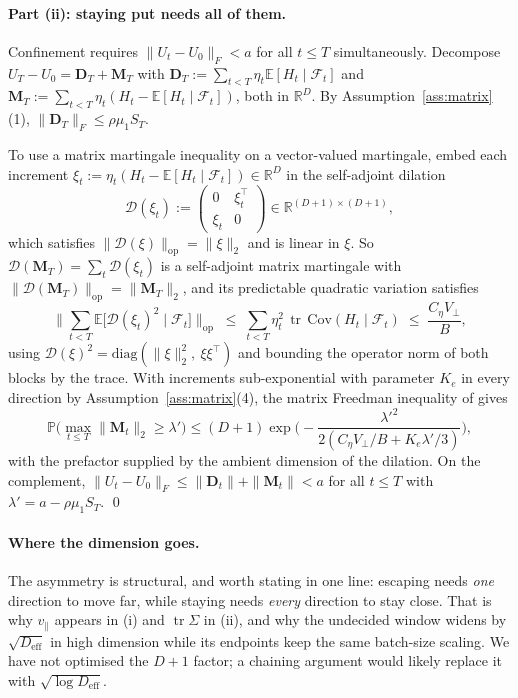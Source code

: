 \documentclass{article}
\theoremstyle{plain}
\theoremstyle{definition}
\theoremstyle{remark}
\newcommand{\E}{\mathbb{E}}
\newcommand{\Prob}{\mathbb{P}}
\newcommand{\R}{\mathbb{R}}
\newcommand{\1}{\mathbf{1}}
\newcommand{\cF}{\mathcal{F}}
\newcommand{\Tr}{\operatorname{tr}}
\begin{document}
\paragraph{Part (ii): staying put needs all of them.}
Confinement requires $\|U_t-U_0\|_F<a$ for all $t\le T$ simultaneously. Decompose
$U_T-U_0 = \mathbf D_T+\mathbf M_T$ with
$\mathbf D_T := \sum_{t<T}\eta_t\E[H_t\mid\cF_t]$ and
$\mathbf M_T := \sum_{t<T}\eta_t(H_t-\E[H_t\mid\cF_t])$, both in $\R^D$. By
Assumption~\ref{ass:matrix}(1), $\|\mathbf D_T\|_F\le\rho\mu_1S_T$.

To use a matrix martingale inequality on a vector-valued martingale, embed each
increment $\xi_t := \eta_t(H_t-\E[H_t\mid\cF_t])\in\R^D$ in the self-adjoint
dilation
\[
\mathcal D(\xi_t) := \begin{pmatrix}0 & \xi_t^\top\\ \xi_t & 0\end{pmatrix}
\in\R^{(D+1)\times(D+1)},
\]
which satisfies $\|\mathcal D(\xi)\|_{\mathrm{op}} = \|\xi\|_2$ and is linear in
$\xi$. So $\mathcal D(\mathbf M_T) = \sum_t\mathcal D(\xi_t)$ is a self-adjoint
matrix martingale with
$\|\mathcal D(\mathbf M_T)\|_{\mathrm{op}} = \|\mathbf M_T\|_2$, and its
predictable quadratic variation satisfies
\[
\Big\|\sum_{t<T}\E\big[\mathcal D(\xi_t)^2\mid\cF_t\big]\Big\|_{\mathrm{op}}
\;\le\; \sum_{t<T}\eta_t^2\,\Tr\,\mathrm{Cov}(H_t\mid\cF_t)
\;\le\; \frac{C_\eta V_\perp}{B},
\]
using $\mathcal D(\xi)^2 = \mathrm{diag}(\|\xi\|_2^2,\ \xi\xi^\top)$ and bounding
the operator norm of both blocks by the trace. With increments sub-exponential
with parameter $K_e$ in every direction by Assumption~\ref{ass:matrix}(4), the
matrix Freedman inequality of \citet{tropp2011freedman} gives
\[
\Prob\Big(\max_{t\le T}\|\mathbf M_t\|_2\ge\lambda'\Big)
\le (D+1)\exp\Big(-\frac{\lambda'^2}{2(C_\eta V_\perp/B+K_e\lambda'/3)}\Big),
\]
with the prefactor supplied by the ambient dimension of the dilation. On the
complement, $\|U_t-U_0\|_F\le\|\mathbf D_t\|+\|\mathbf M_t\|<a$ for all $t\le T$
with $\lambda' = a-\rho\mu_1S_T$. \qed

\paragraph{Where the dimension goes.}
The asymmetry is structural, and worth stating in one line: escaping needs
\emph{one} direction to move far, while staying needs \emph{every} direction to
stay close. That is why $v_\parallel$ appears in (i) and $\Tr\Sigma$ in (ii), and
why the undecided window widens by $\sqrt{D_{\mathrm{eff}}}$ in high dimension
while its endpoints keep the same batch-size scaling. We have not optimised the
$D+1$ factor; a chaining argument would likely replace it with
$\sqrt{\log D_{\mathrm{eff}}}$.
\end{document}
